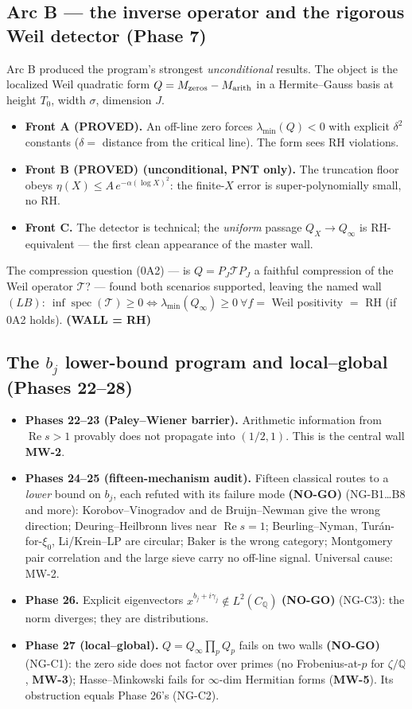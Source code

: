 \documentclass[11pt]{article}
\theoremstyle{remark}
\newcommand{\PROVED}{\textbf{(PROVED)}}
\newcommand{\NOGO}{\textbf{(NO-GO)}}
\newcommand{\WALL}{\textbf{(WALL = RH)}}
\begin{document}
\subsection{Arc B --- the inverse operator and the rigorous Weil detector (Phase 7)}
Arc B produced the program's strongest \emph{unconditional} results. The object is the
localized Weil quadratic form $Q=M_{\rm zeros}-M_{\rm arith}$ in a Hermite--Gauss basis at
height $T_0$, width $\sigma$, dimension $J$.
\begin{itemize}[leftmargin=*]
\item \textbf{Front A \PROVED.} An off-line zero forces $\lambda_{\min}(Q)<0$ with explicit
$\delta^2$ constants ($\delta=$ distance from the critical line). The form sees RH violations.
\item \textbf{Front B \PROVED{} (unconditional, PNT only).} The truncation floor obeys
$\eta(X)\le A\,e^{-\alpha(\log X)^2}$: the finite-$X$ error is super-polynomially small, no RH.
\item \textbf{Front C.} The detector is technical; the \emph{uniform} passage $Q_X\to Q_\infty$
is RH-equivalent --- the first clean appearance of the master wall.
\end{itemize}
The compression question (0A2) --- is $Q=P_J\mathcal T P_J$ a faithful compression of the Weil
operator $\mathcal T$? --- found both scenarios supported, leaving the named wall
$(LB):\ \inf\operatorname{spec}(\mathcal T)\ge0\iff\lambda_{\min}(Q_\infty)\ge0\ \forall
f=$ Weil positivity $=$ RH (if 0A2 holds). \WALL

\subsection{The $b_j$ lower-bound program and local--global (Phases 22--28)}
\begin{itemize}[leftmargin=*]
\item \textbf{Phases 22--23 (Paley--Wiener barrier).} Arithmetic information from
$\operatorname{Re}s>1$ provably does not propagate into $(1/2,1)$. This is the central wall
\textbf{MW-2}.
\item \textbf{Phases 24--25 (fifteen-mechanism audit).} Fifteen classical routes to a
\emph{lower} bound on $b_j$, each refuted with its failure mode \NOGO{} (NG-B1\dots B8 and more):
Korobov--Vinogradov and de Bruijn--Newman give the wrong direction; Deuring--Heilbronn lives
near $\operatorname{Re}s=1$; Beurling--Nyman, Tur\'an-for-$\xi_0$, Li/Krein--LP are circular;
Baker is the wrong category; Montgomery pair correlation and the large sieve carry no off-line
signal. Universal cause: MW-2.
\item \textbf{Phase 26.} Explicit eigenvectors $x^{b_j+i\gamma_j}\notin L^2(C_{\mathbb Q})$
\NOGO{} (NG-C3): the norm diverges; they are distributions.
\item \textbf{Phase 27 (local--global).} $Q=Q_\infty\prod_pQ_p$ fails on two walls \NOGO{}
(NG-C1): the zero side does not factor over primes (no Frobenius-at-$p$ for $\zeta/\mathbb Q$,
\textbf{MW-3}); Hasse--Minkowski fails for $\infty$-dim Hermitian forms (\textbf{MW-5}). Its
obstruction equals Phase 26's (NG-C2).
\end{itemize}
\end{document}
